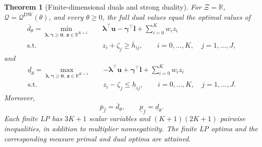 \documentclass[review,11pt,3p,authoryear,nopreprintline]{elsarticle}
\newtheorem{theorem}{Theorem}
\begin{document}
\begin{theorem}[Finite-dimensional duals and strong duality]
  \label{thm-finite-dual-reformulations}
  For $\Xi=\mathbb R$, $\mathcal Q=\mathcal Q^{\mathrm{DW}}(\theta)$, and every $\theta\ge0$, the full dual values equal the optimal values of
  \begin{equation}
    \begin{aligned}
      \overline d_\theta
      =\min_{\bm\lambda,\bm\gamma\ge\bm 0,\ \bm z\in\mathbb R^{K+1}}\quad&
        \bm\lambda^\top\bm u-\bm\gamma^\top\bm l+\sum_{i=0}^K w_i z_i\\
      \text{s.t.}\quad&
        z_i+\zeta_j\ge\overline h_{ij},
        \qquad i=0,\ldots,K,\quad j=1,\ldots,J,
    \end{aligned}
    \label{eq-finite-upper-dual}
  \end{equation}
  and
  \begin{equation}
    \begin{aligned}
      \underline d_\theta
      =\max_{\bm\lambda,\bm\gamma\ge\bm 0,\ \bm z\in\mathbb R^{K+1}}\quad&
        -\bm\lambda^\top\bm u+\bm\gamma^\top\bm l+\sum_{i=0}^K w_i z_i\\
      \text{s.t.}\quad&
        z_i-\zeta_j\le\underline h_{ij},
        \qquad i=0,\ldots,K,\quad j=1,\ldots,J.
    \end{aligned}
    \label{eq-finite-lower-dual}
  \end{equation}
  Moreover,
  \begin{equation}
    \overline p_{\hat f}=\overline d_\theta,\qquad
    \underline p_{\hat f}=\underline d_\theta.
    \label{eq-strong-duality}
  \end{equation}
  Each finite LP has $3K+1$ scalar variables and $(K+1)(2K+1)$ pairwise inequalities, in addition to multiplier nonnegativity. The finite LP optima and the corresponding measure primal and dual optima are attained.
\end{theorem}
\end{document}
